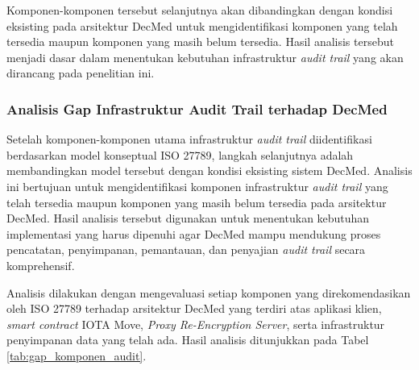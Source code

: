 Komponen-komponen tersebut selanjutnya akan dibandingkan dengan kondisi eksisting pada arsitektur DecMed untuk mengidentifikasi komponen yang telah tersedia maupun komponen yang masih belum tersedia. Hasil analisis tersebut menjadi dasar dalam menentukan kebutuhan infrastruktur \textit{audit trail} yang akan dirancang pada penelitian ini.

\subsubsection{Analisis Gap Infrastruktur Audit Trail terhadap DecMed}

Setelah komponen-komponen utama infrastruktur \textit{audit trail} diidentifikasi berdasarkan model konseptual ISO 27789, langkah selanjutnya adalah membandingkan model tersebut dengan kondisi eksisting sistem DecMed. Analisis ini bertujuan untuk mengidentifikasi komponen infrastruktur \textit{audit trail} yang telah tersedia maupun komponen yang masih belum tersedia pada arsitektur DecMed. Hasil analisis tersebut digunakan untuk menentukan kebutuhan implementasi yang harus dipenuhi agar DecMed mampu mendukung proses pencatatan, penyimpanan, pemantauan, dan penyajian \textit{audit trail} secara komprehensif.

Analisis dilakukan dengan mengevaluasi setiap komponen yang direkomendasikan oleh ISO 27789 terhadap arsitektur DecMed yang terdiri atas aplikasi klien, \textit{smart contract} IOTA Move, \textit{Proxy Re-Encryption Server}, serta infrastruktur penyimpanan data yang telah ada. Hasil analisis ditunjukkan pada Tabel \ref{tab:gap_komponen_audit}.

